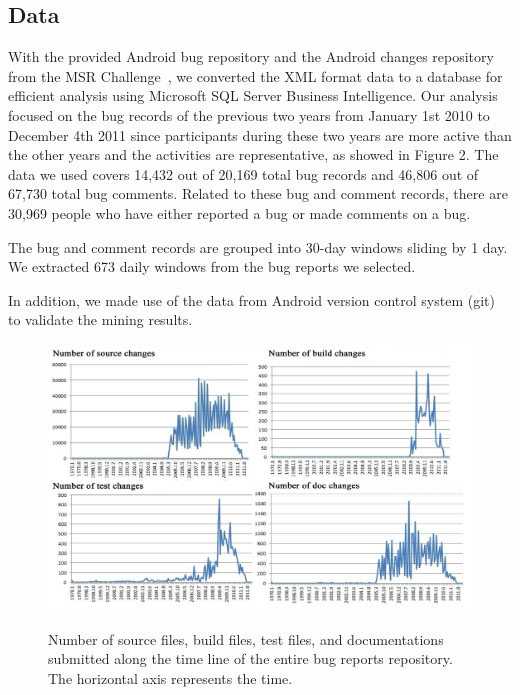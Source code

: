\documentclass[10pt, conference, compsocconf]{IEEEtran}
\begin{document}
\subsection{Data}

With the provided Android bug repository and the Android changes
repository from the MSR Challenge~\cite{DATA:msr}, we converted the XML format data to
a database for efficient analysis using Microsoft SQL Server Business
Intelligence. Our analysis focused on the bug records of the previous
two years from January 1st 2010 to December 4th 2011 since participants
during these two years are more active than the other years and the
activities are representative, as showed in Figure 2. The data we used
covers 14,432 out of 20,169 total bug records and 46,806 out of 67,730
total bug comments. Related to these bug and comment records, there
are 30,969 people who have either reported a bug or made comments on a
bug.


The bug and comment records are grouped into 30-day windows sliding by
1 day. 
We extracted 673 daily windows  from the bug reports we selected.

In addition, we made use of the data from Android version control
system (git)
to validate the mining results.


\begin{figure}[ht]
\centering
\includegraphics[width=13cm]{2010-2011.png}
\label{2010-2011}
\caption{Number of source files, build files, test files, and documentations submitted along the time line of the entire bug reports repository. The horizontal axis represents the time.}
\end{figure}
\end{document}
